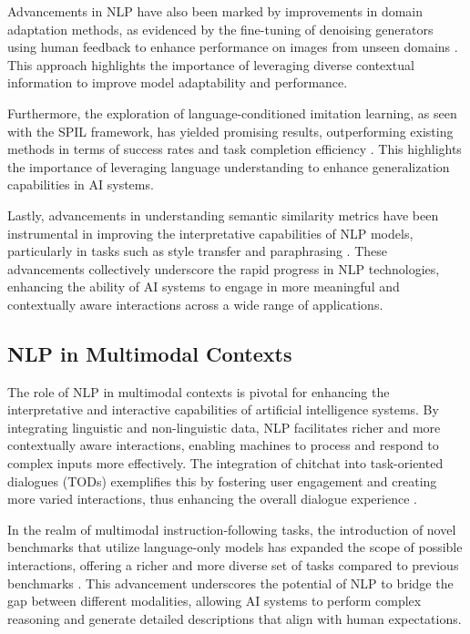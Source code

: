 Advancements in NLP have also been marked by improvements in domain adaptation methods, as evidenced by the fine-tuning of denoising generators using human feedback to enhance performance on images from unseen domains \cite{park2023domainadaptationbasedhuman}. This approach highlights the importance of leveraging diverse contextual information to improve model adaptability and performance.



Furthermore, the exploration of language-conditioned imitation learning, as seen with the SPIL framework, has yielded promising results, outperforming existing methods in terms of success rates and task completion efficiency \cite{zhou2024languageconditionedimitationlearningbase}. This highlights the importance of leveraging language understanding to enhance generalization capabilities in AI systems.



Lastly, advancements in understanding semantic similarity metrics have been instrumental in improving the interpretative capabilities of NLP models, particularly in tasks such as style transfer and paraphrasing \cite{yamshchikov2020styletransferparaphraselookingsensible}. These advancements collectively underscore the rapid progress in NLP technologies, enhancing the ability of AI systems to engage in more meaningful and contextually aware interactions across a wide range of applications.



\subsection{NLP in Multimodal Contexts} \label{subsec:NLP in Multimodal Contexts}

The role of NLP in multimodal contexts is pivotal for enhancing the interpretative and interactive capabilities of artificial intelligence systems. By integrating linguistic and non-linguistic data, NLP facilitates richer and more contextually aware interactions, enabling machines to process and respond to complex inputs more effectively. The integration of chitchat into task-oriented dialogues (TODs) exemplifies this by fostering user engagement and creating more varied interactions, thus enhancing the overall dialogue experience \cite{stricker2024enhancingtaskorienteddialogueschitchat}.



In the realm of multimodal instruction-following tasks, the introduction of novel benchmarks that utilize language-only models has expanded the scope of possible interactions, offering a richer and more diverse set of tasks compared to previous benchmarks \cite{liu2024visual}. This advancement underscores the potential of NLP to bridge the gap between different modalities, allowing AI systems to perform complex reasoning and generate detailed descriptions that align with human expectations.



